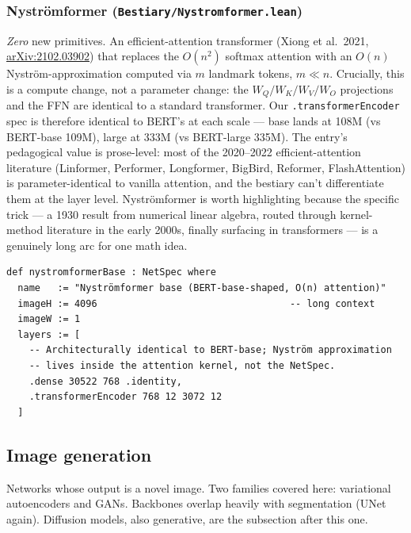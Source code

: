 \subsubsection*{Nyströmformer (\texttt{Bestiary/Nystromformer.lean})}
\emph{Zero} new primitives. An efficient-attention transformer
(Xiong et al.\ 2021,
\href{https://arxiv.org/abs/2102.03902}{arXiv:2102.03902}) that
replaces the $O(n^2)$ softmax attention
with an $O(n)$ Nyström-approximation computed via $m$ landmark
tokens, $m \ll n$. Crucially, this is a compute change, not
a parameter change: the $W_Q / W_K / W_V / W_O$ projections and the
FFN are identical to a standard transformer. Our
\texttt{.transformerEncoder} spec is therefore identical to
BERT's at each scale --- base lands at 108M (vs BERT-base 109M),
large at 333M (vs BERT-large 335M). The entry's pedagogical value is
prose-level: most of the 2020--2022 efficient-attention literature
(Linformer, Performer, Longformer, BigBird, Reformer,
FlashAttention) is parameter-identical to vanilla attention, and the
bestiary can't differentiate them at the layer level. Nyströmformer
is worth highlighting because the specific trick --- a 1930 result
from numerical linear algebra, routed through kernel-method
literature in the early 2000s, finally surfacing in transformers ---
is a genuinely long arc for one math idea.

\begin{verbatim}
def nystromformerBase : NetSpec where
  name   := "Nyströmformer base (BERT-base-shaped, O(n) attention)"
  imageH := 4096                                  -- long context
  imageW := 1
  layers := [
    -- Architecturally identical to BERT-base; Nyström approximation
    -- lives inside the attention kernel, not the NetSpec.
    .dense 30522 768 .identity,
    .transformerEncoder 768 12 3072 12
  ]
\end{verbatim}

\subsection{Image generation}

Networks whose output is a novel image. Two families covered here:
variational autoencoders and GANs. Backbones overlap heavily with
segmentation (UNet again). Diffusion models, also generative, are the
subsection after this one.

